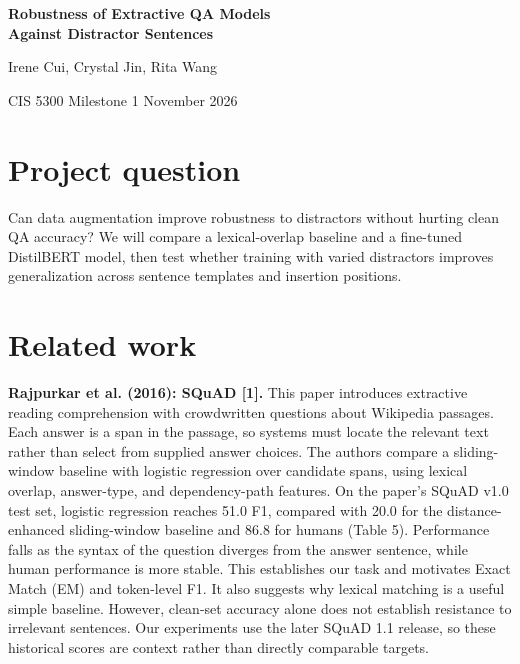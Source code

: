 \documentclass[11pt,letterpaper]{article}
\begin{document}
\begin{center}
{\Large\bfseries Robustness of Extractive QA Models\\Against Distractor Sentences}\par
\vspace{4pt}
{Irene Cui, Crystal Jin, Rita Wang}\par
{CIS 5300 \quad Milestone 1 \quad November 2026}
\end{center}
\vspace{-6pt}

\section*{Project question}
Can data augmentation improve robustness to distractors without hurting clean QA accuracy? We will compare a lexical-overlap baseline and a fine-tuned DistilBERT model, then test whether training with varied distractors improves generalization across sentence templates and insertion positions.

\section*{Related work}
\textbf{Rajpurkar et al. (2016): SQuAD [1].}
This paper introduces extractive reading comprehension with crowdwritten questions about Wikipedia passages. Each answer is a span in the passage, so systems must locate the relevant text rather than select from supplied answer choices. The authors compare a sliding-window baseline with logistic regression over candidate spans, using lexical overlap, answer-type, and dependency-path features. On the paper's SQuAD v1.0 test set, logistic regression reaches 51.0 F1, compared with 20.0 for the distance-enhanced sliding-window baseline and 86.8 for humans (Table 5). Performance falls as the syntax of the question diverges from the answer sentence, while human performance is more stable. This establishes our task and motivates Exact Match (EM) and token-level F1. It also suggests why lexical matching is a useful simple baseline. However, clean-set accuracy alone does not establish resistance to irrelevant sentences. Our experiments use the later SQuAD 1.1 release, so these historical scores are context rather than directly comparable targets.
\end{document}
